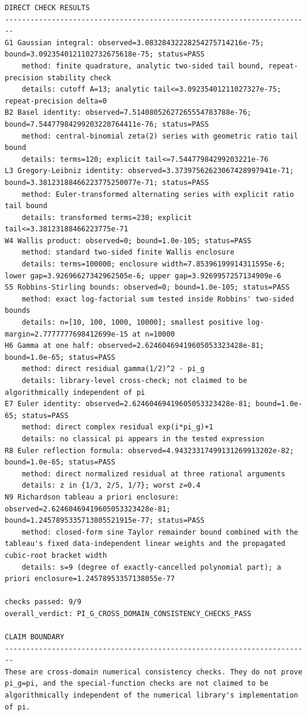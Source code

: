 \documentclass[11pt]{article}
\begin{document}
\begin{lstlisting}[style=outputstyle,caption={Canonical verification output}]
DIRECT CHECK RESULTS
------------------------------------------------------------------------
G1 Gaussian integral: observed=3.08328432228254275714216e-75; bound=3.0923540121102732675618e-75; status=PASS
    method: finite quadrature, analytic two-sided tail bound, repeat-precision stability check
    details: cutoff A=13; analytic tail<=3.09235401211027327e-75; repeat-precision delta=0
B2 Basel identity: observed=7.51408052627265554783788e-76; bound=7.54477984299203220764411e-76; status=PASS
    method: central-binomial zeta(2) series with geometric ratio tail bound
    details: terms=120; explicit tail<=7.54477984299203221e-76
L3 Gregory-Leibniz identity: observed=3.37397562623067428997941e-71; bound=3.38123188466223775250077e-71; status=PASS
    method: Euler-transformed alternating series with explicit ratio tail bound
    details: transformed terms=230; explicit tail<=3.38123188466223775e-71
W4 Wallis product: observed=0; bound=1.0e-105; status=PASS
    method: standard two-sided finite Wallis enclosure
    details: terms=100000; enclosure width=7.85396199914311595e-6; lower gap=3.92696627342962505e-6; upper gap=3.9269957257134909e-6
S5 Robbins-Stirling bounds: observed=0; bound=1.0e-105; status=PASS
    method: exact log-factorial sum tested inside Robbins' two-sided bounds
    details: n=[10, 100, 1000, 10000]; smallest positive log-margin=2.7777777698412699e-15 at n=10000
H6 Gamma at one half: observed=2.62460469419605053323428e-81; bound=1.0e-65; status=PASS
    method: direct residual gamma(1/2)^2 - pi_g
    details: library-level cross-check; not claimed to be algorithmically independent of pi
E7 Euler identity: observed=2.62460469419605053323428e-81; bound=1.0e-65; status=PASS
    method: direct complex residual exp(i*pi_g)+1
    details: no classical pi appears in the tested expression
R8 Euler reflection formula: observed=4.94323317499131269913202e-82; bound=1.0e-65; status=PASS
    method: direct normalized residual at three rational arguments
    details: z in {1/3, 2/5, 1/7}; worst z=0.4
N9 Richardson tableau a priori enclosure: observed=2.62460469419605053323428e-81; bound=1.2457895335713805521915e-77; status=PASS
    method: closed-form sine Taylor remainder bound combined with the tableau's fixed data-independent linear weights and the propagated cubic-root bracket width
    details: s=9 (degree of exactly-cancelled polynomial part); a priori enclosure=1.24578953357138055e-77

checks passed: 9/9
overall_verdict: PI_G_CROSS_DOMAIN_CONSISTENCY_CHECKS_PASS

CLAIM BOUNDARY
------------------------------------------------------------------------
These are cross-domain numerical consistency checks. They do not prove pi_g=pi, and the special-function checks are not claimed to be algorithmically independent of the numerical library's implementation of pi.
\end{lstlisting}
\end{document}
